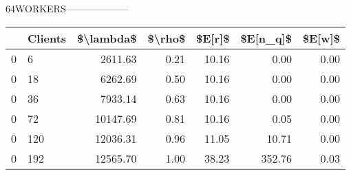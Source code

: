 64WORKERS--------------------
\begin{tabular}{llrrrrr}
\toprule
{} & Clients &  \$\textbackslash lambda\$ &  \$\textbackslash rho\$ &  \$E[r]\$ &  \$E[n\_q]\$ &  \$E[w]\$ \\
\midrule
0 &       6 &    2611.63 &    0.21 &   10.16 &      0.00 &    0.00 \\
0 &      18 &    6262.69 &    0.50 &   10.16 &      0.00 &    0.00 \\
0 &      36 &    7933.14 &    0.63 &   10.16 &      0.00 &    0.00 \\
0 &      72 &   10147.69 &    0.81 &   10.16 &      0.05 &    0.00 \\
0 &     120 &   12036.31 &    0.96 &   11.05 &     10.71 &    0.00 \\
0 &     192 &   12565.70 &    1.00 &   38.23 &    352.76 &    0.03 \\
\bottomrule
\end{tabular}
